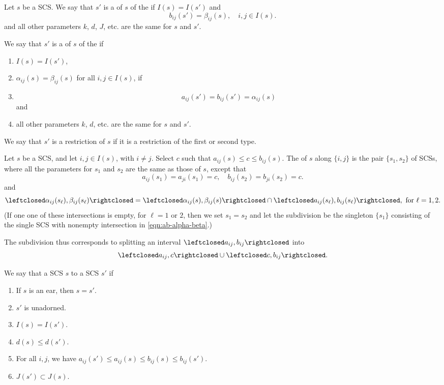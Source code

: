 \begin{definition}[restriction]
Let $s$ be a SCS.
We say that $s'$ is a  of $s$ of the  if $I(s)=I(s')$ and
\[
b_{ij}(s') =  \beta_{ij}(s), \quad i,j\in I(s).
\]
and all other parameters $k$, $d$, $J$, etc. are
the same for $s$ and $s'$.

We say that $s'$ is a  of $s$ of the  if 
\begin{enumerate}
\item $I(s)=I(s')$,
\item $\alpha_{ij}(s)=\beta_{ij}(s)$ for all $i,j\in I(s)$, if
\item
\[
a_{ij}(s') = b_{ij}(s') = \alpha_{i j} (s)
\]
and 
\item all other parameters $k$, $d$, etc.
are
the same for $s$ and $s'$.
\end{enumerate}
We say that $s'$ is a restriction of $s$ if it is a restriction of
the first or second type.
\end{definition}


\begin{definition}[subdivision] 
Let $s$ be a SCS,
and let $i,j\in  I(s)$, with $i\ne j$.  Select $c$ such that $a_{ij}(s)\le c\le b_{ij}(s)$.
The  of $s$ along $\{i,j\}$ is the pair $\{s_1,s_2\}$ 
of SCSs, where all the parameters for $s_1$ and $s_2$
are the same as those of $s$, except that
\[
a_{ij}(s_1)=a_{ji}(s_1) = c,  \quad  b_{ij}(s_2) = b_{ji}(s_2)=c.
\]
and
\begin{equation}\label{eqn:ab-alpha-beta}
\leftclosed\alpha_{ij}(s_\ell),\beta_{ij}(s_\ell)\rightclosed =
\leftclosed\alpha_{ij}(s),\beta_{ij}(s)\rightclosed\cap
\leftclosed a_{ij}(s_\ell),b_{ij}(s_\ell)\rightclosed, \text{ for } \ell=1,2.
\end{equation}
(If one one of these intersections is empty, for $\ell=1$ or $2$,  then we set $s_1=s_2$ and
let the subdivision be the singleton $\{s_1\}$ consisting of the single SCS  with nonempty intersection
in \eqref{eqn:ab-alpha-beta}.)
\end{definition}
The subdivision thus corresponds to splitting an interval 
$\leftclosed a_{ij},b_{ij}\rightclosed$ into
\[
\leftclosed a_{ij},c\rightclosed \cup \leftclosed c,b_{ij}\rightclosed.
\]



\begin{definition}  
We say that a SCS $s$
 to a SCS $s'$ if
\begin{enumerate}
\item If $s$ is an ear, then $s=s'$.
\item $s'$ is unadorned.
\item $I(s) = I(s')$.
\item $d(s)\le d(s')$.
\item For all $i,j$, we have $a_{ij}(s')\le a_{ij}(s)\le b_{ij}(s)\le b_{ij}(s')$.
\item $J(s')\subset J(s)$.
\end{enumerate}
\end{definition}

